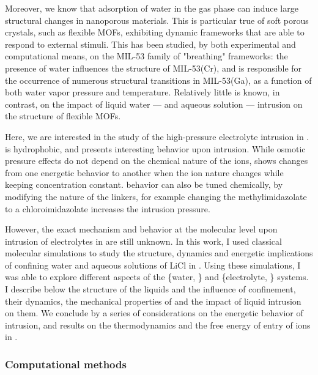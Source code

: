 \documentclass[thesis]{subfiles}
\begin{document}
Moreover, we know that adsorption of water in the gas phase can induce large
structural changes in nanoporous materials\cite{Lee2001, Seoung2013}. This is
particular true of soft porous crystals\cite{Horike2009}, such as
flexible MOFs\cite{Schneemann2014}, exhibiting dynamic frameworks that are
able to respond to external stimuli. This has been studied, by both experimental
and computational means, on the MIL-53 family of "breathing" frameworks: the
presence of water influences the structure of MIL-53(Cr)\cite{Haigis2013}, and
is responsible for the occurrence of numerous structural transitions in
MIL-53(Ga), as a function of both water vapor pressure and
temperature\cite{Boutin2013, Coudert2014}. Relatively little is known, in
contrast, on the impact of liquid water --- and aqueous solution --- intrusion
on the structure of flexible MOFs.

Here, we are interested in the study of the high-pressure electrolyte intrusion
in .  is hydrophobic\cite{AOrtiz2014}, and presents interesting
behavior upon intrusion. While osmotic pressure effects do not depend on the
chemical nature of the ions,  shows changes from one energetic behavior to
another when the ion nature changes while keeping concentration
constant\cite{Ortiz2014}.  behavior can also be tuned chemically, by
modifying the nature of the linkers, for example changing the methylimidazolate
to a chloroimidazolate increases the intrusion pressure\cite{Mortada2018}.

However, the exact mechanism and behavior at the molecular level upon intrusion
of electrolytes in  are still unknown. In this work, I used classical
molecular simulations to study the structure, dynamics and energetic
implications of confining water and aqueous solutions of LiCl in . Using
these simulations, I was able to explore different aspects of the \{water,
\} and \{electrolyte, \} systems. I describe below the structure of
the liquids and the influence of confinement, their dynamics, the mechanical
properties of  and the impact of liquid intrusion on them. We conclude by a
series of considerations on the energetic behavior of intrusion, and results on
the thermodynamics and the free energy of entry of ions in .

\subsubsection{Computational methods}
\end{document}
